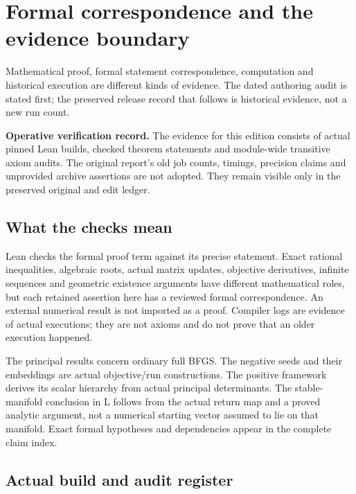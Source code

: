 \chapter{Formal correspondence and the evidence boundary}\label{comp:E}\label{E:chapter}
\renewcommand{\ModuleTag}{14}
Mathematical proof, formal statement correspondence, computation and historical execution are different kinds of evidence. The dated authoring audit is stated first; the preserved release record that follows is historical evidence, not a new run count.



\textbf{Operative verification record.} The evidence for this edition consists of actual pinned Lean builds, checked theorem statements and module-wide transitive axiom audits. The original report's old job counts, timings, precision claims and unprovided archive assertions are not adopted. They remain visible only in the preserved original and edit ledger.



\section{What the checks mean}\label{what-the-checks-mean}

Lean checks the formal proof term against its precise statement. Exact rational inequalities, algebraic roots, actual matrix updates, objective derivatives, infinite sequences and geometric existence arguments have different mathematical roles, but each retained assertion here has a reviewed formal correspondence. An external numerical result is not imported as a proof. Compiler logs are evidence of actual executions; they are not axioms and do not prove that an older execution happened.

The principal results concern ordinary full BFGS. The negative seeds and their embeddings are actual objective/run constructions. The positive framework derives its scalar hierarchy from actual principal determinants. The stable-manifold conclusion in L follows from the actual return map and a proved analytic argument, not a numerical starting vector assumed to lie on that manifold. Exact formal hypotheses and dependencies appear in the complete claim index.



\section{Actual build and audit register}\label{fresh-execution-register}

